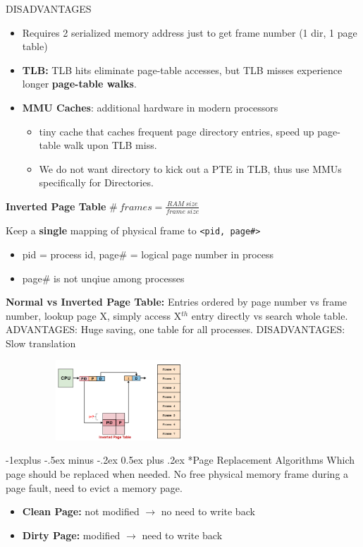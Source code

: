 \documentclass[10pt,landscape]{article}
\makeatletter
\renewcommand{\subsection}{\@startsection{section}{1}{0mm}%
                                {-1ex plus -.5ex minus -.2ex}%
                                {0.5ex plus .2ex}%
                                {\normalfont\large\bfseries}}
\renewcommand{\subsection}{\@startsection{subsection}{2}{0mm}%
                                {-1explus -.5ex minus -.2ex}%
                                {0.5ex plus .2ex}%
                                {\normalfont\normalsize\bfseries}}
\makeatother
\begin{document}
\begin{multicols*}{3}
DISADVANTAGES
\begin{itemize}[topsep=0pt,noitemsep,wide=0pt, leftmargin=\dimexpr{} + 2\relax]
    \item Requires 2 serialized memory address just to get frame number (1 dir, 1 page table)
    \item \textbf{TLB:} TLB hits eliminate page-table accesses, but TLB misses experience longer \textbf{page-table walks}.
    \item \textbf{MMU Caches}: additional hardware in modern processors
    \begin{itemize}[topsep=0pt,noitemsep,wide=0pt, leftmargin=\dimexpr{} + 2\relax]
        \item tiny cache that caches frequent page directory entries, speed up page-table walk upon TLB miss.
        \item We do not want directory to kick out a PTE in TLB, thus use MMUs specifically for Directories.
    \end{itemize}
\end{itemize}


\textbf{Inverted Page Table}
\colorbox{yellow!80}{%
    $\# \ frames = \frac{RAM \ size}{frame \ size}$
}

Keep a \textbf{single} mapping of physical frame to \verb|<pid, page#>|
\begin{itemize}[topsep=0pt,noitemsep,wide=0pt, leftmargin=\dimexpr{} + 2\relax]
    \item pid = process id, page\# = logical page number in process
    \item page\# is not unqiue among processes
\end{itemize}
\textbf{Normal vs Inverted Page Table:} Entries ordered by page number vs frame number, lookup page X, simply access X$^{th}$ entry directly vs search whole table. 
ADVANTAGES: Huge saving, one table for all processes. DISADVANTAGES: Slow translation

\includegraphics[width=8.5cm, height=3cm]{images/invertedpagetable.png}

\subsection*{Page Replacement Algorithms}
Which page should be replaced when needed. No free physical memory frame during a page fault, need to evict a memory page.
\begin{itemize}[topsep=0pt,noitemsep,wide=0pt, leftmargin=\dimexpr{} + 2\relax]
    \item \textbf{Clean Page:} not modified $\rightarrow$ no need to write back
    \item \textbf{Dirty Page:} modified $\rightarrow$ need to write back
\end{itemize}


\end{multicols*}
\end{document}

